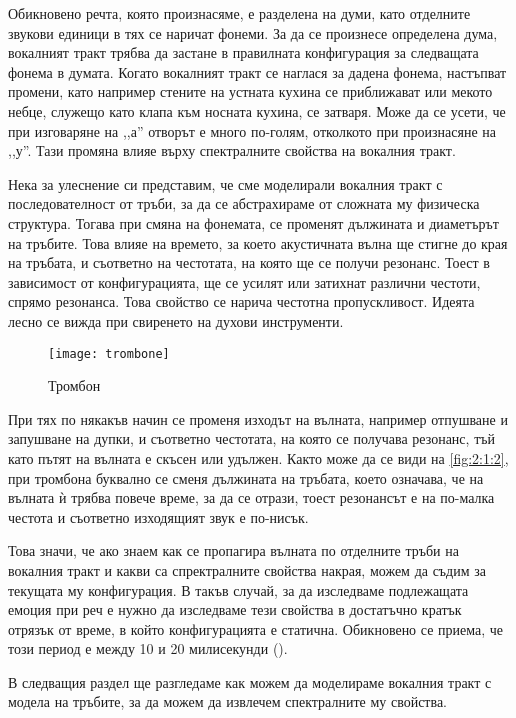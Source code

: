 \documentclass[main.tex]{subfiles}
\begin{document}
    Обикновено речта, която произнасяме, е разделена на думи, като отделните звукови единици в тях се наричат фонеми. За да се произнесе определена дума,
    вокалният тракт трябва да застане в правилната конфигурация за следващата фонема в думата. Когато
    вокалният тракт се наглася за дадена фонема, настъпват промени, като например стените на устната кухина се приближават или мекото небце, служещо като клапа към носната
    кухина, се затваря. Може да се усети, че при изговаряне на ,,а'' отворът е много по-голям, отколкото при произнасяне на ,,у''.
    Тази промяна влияе върху спектралните свойства на вокалния тракт.
    
    Нека за улеснение си представим, че сме моделирали вокалния тракт с последователност от тръби, за да се абстрахираме от сложната му физическа структура.
    Тогава при смяна на фонемата, се променят дължината и диаметърът на тръбите. Това влияе на времето, за което акустичната вълна ще стигне до края на тръбата,
    и съответно на честотата, на която ще се получи резонанс. Тоест в зависимост от конфигурацията, ще се усилят или затихнат различни честоти, спрямо резонанса.
    Това свойство се нарича честотна пропускливост. Идеята лесно се вижда при свиренето на духови инструменти.

    \begin{figure}[ht]%
    \texttt{[image: trombone]}%
    \caption{Тромбон}%
    \label{fig:2:1:2}
    \end{figure}

    При тях по някакъв начин се променя изходът на вълната, например отпушване и запушване на дупки, и съответно честотата, на която се
    получава резонанс, тъй като пътят на вълната е скъсен или удължен. Както може да се види на \autoref{fig:2:1:2}, при тромбона буквално се сменя дължината на тръбата,
    което означава, че на вълната ѝ трябва повече време, за да се отрази, тоест резонансът е на по-малка честота и съответно изходящият звук е по-нисък.

    Това значи, че ако знаем как се пропагира вълната по отделните тръби на вокалния тракт и
    какви са спректралните свойства накрая, можем да съдим за текущата му конфигурация.
    В такъв случай, за да изследваме подлежащата емоция при реч е нужно да изследваме тези свойства в достатъчно кратък отрязък от време,
    в който конфигурацията е статична. Обикновено се приема, че този период е между 10 и 20 милисекунди (\cite[стр.~98]{rabiner_schafer78}).
    
    В следващия раздел ще разгледаме как можем да моделираме вокалния тракт с модела на тръбите, за да можем да извлечем спектралните му свойства.
\end{document}
